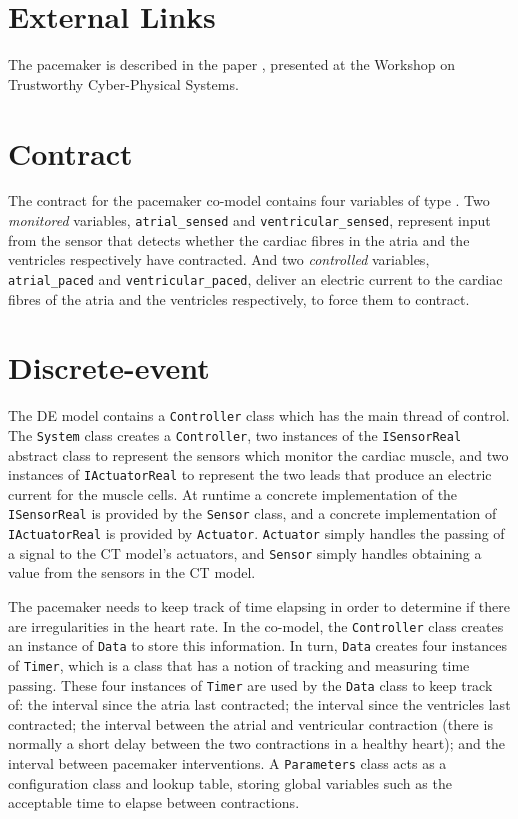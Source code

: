 \section{External Links}
The pacemaker is described in the paper \cite{Gamble&12}, presented at
the Workshop on Trustworthy Cyber-Physical Systems.

\section{Contract} The contract for the pacemaker co-model contains
four variables of type .  Two \emph{monitored} variables,
\texttt{atrial\_sensed} and \texttt{ventricular\_sensed}, represent
input from the sensor that detects whether the cardiac fibres in the
atria and the ventricles respectively have contracted.  And two
\emph{controlled} variables, \texttt{atrial\_paced} and
\texttt{ventricular\_paced}, deliver an electric current to the
cardiac fibres of the atria and the ventricles respectively, to force
them to contract.

\section{Discrete-event} The DE model contains a
\texttt{Controller} class which has the main thread of control.  The
\texttt{System} class creates a \texttt{Controller}, two instances of
the \texttt{ISensorReal} abstract class to represent the sensors which
monitor the cardiac muscle, and two instances of
\texttt{IActuatorReal} to represent the two leads that produce an
electric current for the muscle cells.  At runtime a concrete
implementation of the \texttt{ISensorReal} is provided by the
\texttt{Sensor} class, and a concrete implementation of
\texttt{IActuatorReal} is provided by \texttt{Actuator}.
\texttt{Actuator} simply handles the passing of a signal to the CT
model's actuators, and \texttt{Sensor} simply handles obtaining a
value from the sensors in the CT model.

The pacemaker needs to keep track of time elapsing in order to
determine if there are irregularities in the heart rate.  In the
co-model, the \texttt{Controller} class creates an instance of
\texttt{Data} to store this information.  In turn, \texttt{Data}
creates four instances of \texttt{Timer}, which is a class that has a
notion of tracking and measuring time passing.  These four instances
of \texttt{Timer} are used by the \texttt{Data} class to keep track
of: the interval since the atria last contracted; the interval since
the ventricles last contracted; the interval between the atrial and
ventricular contraction (there is normally a short delay between the
two contractions in a healthy heart); and the interval between
pacemaker interventions.  A \texttt{Parameters} class acts as a
configuration class and lookup table, storing global variables such as
the acceptable time to elapse between contractions.

